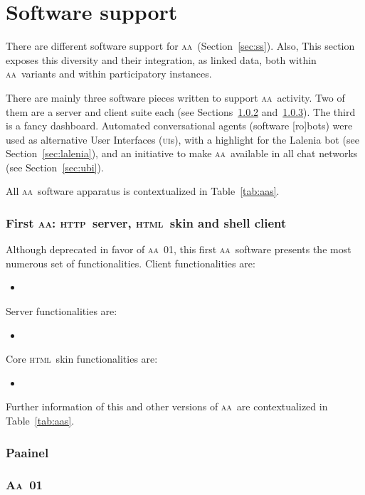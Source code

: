 \documentclass[a4paper, 11pt]{article} %
\newcommand{\httpb}{\textsc{http}}
\newcommand{\html}{\textsc{html}}
\newcommand{\aab}{\textsc{aa}}
\newcommand{\aai}{\textsc{Aa}}
\newcommand{\paaineli}{P{\bf \sc aa}inel}
\newcommand{\ui}{\textsc{ui}}
\begin{document}
 \section{Software support}\label{sec:sofsup}
 There are different software support for \aab\ (Section~\ref{sec:ss}). Also,  This section exposes this diversity and their integration, as linked data, both within \aab\ variants and within participatory instances.

There are mainly three software pieces written to support \aab\ activity. Two of them are a server and client suite each (see Sections~\ref{sec:aaFirst} and~\ref{sec:aa01}). The third is a fancy dashboard. Automated conversational agents (software [ro]bots) were used as alternative User Interfaces (\ui s), with a highlight for the Lalenia bot (see Section~\ref{sec:lalenia}), and an initiative to make \aab\ available in all chat networks (see Section~\ref{sec:ubi}).

All \aab\ software apparatus is contextualized in Table~\ref{tab:aas}.
\subsubsection{First \aab: \httpb\ server, \html\ skin and shell client}\label{sec:aaFirst}
Although deprecated in favor of \aab\ 01, this first \aab\ software presents the most numerous set of functionalities. Client functionalities are:
\begin{itemize}
    \item 
\end{itemize}

Server functionalities are:
\begin{itemize}
    \item
\end{itemize}

Core \html\ skin functionalities are:
\begin{itemize}
    \item
\end{itemize}


Further information of this and other versions of \aab\ are contextualized in Table~\ref{tab:aas}.
\subsubsection{\paaineli}\label{sec:aaFirst}
\subsubsection{\aai\ 01}\label{sec:aa01}
\end{document}
